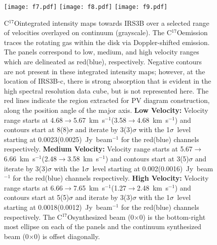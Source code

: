 \documentclass[twocolumn, 12pt]{aastex63}
\newcommand{\cso}{C$^{17}$O}
\newcommand{\kms}{km~s$^{-1}$}
\newcommand{\csobeam}{0\farcs21$\times$0\farcs13}
\newcommand{\contbeam}{0\farcs11$\times$0\farcs05}
\begin{document}
\begin{figure}[H]
\begin{center}
   \texttt{[image: f7.pdf]} 
   \texttt{[image: f8.pdf]} 
   \texttt{[image: f9.pdf]} 
\end{center}
   \caption{\cso\space integrated intensity maps towards IRS3B over a selected range of velocities overlayed on continuum (grayscale). The \cso\space emission traces the rotating gas within the disk via Doppler-shifted emission. The panels correspond to low, medium, and high velocity ranges which are delineated as red(blue), respectively. Negative contours are not present in these integrated intensity maps; however, at the location of IRS3B-c, there is strong absorption that is evident in the high spectral resolution data cube, but is not represented here. The red lines indicate the region extracted for PV diagram construction, along the position angle of the major axis. \textbf{Low Velocity:} Velocity range starts at 4.68$\rightarrow$5.67~\kms (3.58$\rightarrow$4.68~\kms) and contours start at 8(8)$\sigma$ and iterate by 3(3)$\sigma$ with the 1$\sigma$~level starting at 0.0023(0.0025)~Jy~beam$^{-1}$ for the red(blue) channels respectively. \textbf{Medium Velocity:} Velocity range starts at 5.67$\rightarrow$6.66~\kms (2.48$\rightarrow$3.58~\kms) and contours start at 3(5)$\sigma$ and iterate by 3(3)$\sigma$ with the 1$\sigma$~level starting at 0.002(0.0016)~Jy~beam$^{-1}$ for the red(blue) channels respectively. \textbf{High Velocity:} Velocity range starts at 6.66$\rightarrow$7.65~\kms (1.27$\rightarrow$2.48~\kms) and contours start at 5(5)$\sigma$ and iterate by 3(3)$\sigma$ with the 1$\sigma$~level starting at 0.0018(0.0012)~Jy~beam$^{-1}$ for the red(blue) channels respectively. The \cso\space synthesized beam (\csobeam) is the bottom-right most ellipse on each of the panels and the continuum synthesized beam (\contbeam) is offset diagonally.}\label{fig:irs3bc17omoment}
\end{figure}
\end{document}

